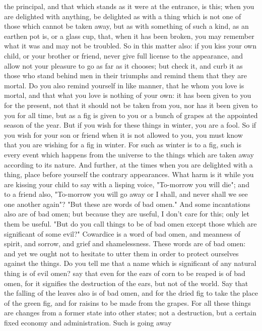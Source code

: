 \documentclass[a4paper]{article}
\begin{document}
the principal, and that which stands as it were at the entrance, is this; when
you are delighted with anything, be delighted as with a thing which is not one
of those which cannot be taken away, but as with something of such a kind, as
an earthen pot is, or a glass cup, that, when it has been broken, you may
remember what it was and may not be troubled. So in this matter also: if you
kiss your own child, or your brother or friend, never give full license to the
appearance, and allow not your pleasure to go as far as it chooses; but check
it, and curb it as those who stand behind men in their triumphs and remind them
that they are mortal. Do you also remind yourself in like manner, that he whom
you love is mortal, and that what you love is nothing of your own: it has been
given to you for the present, not that it should not be taken from you, nor has
it been given to you for all time, but as a fig is given to you or a bunch of
grapes at the appointed season of the year. But if you wish for these things in
winter, you are a fool. So if you wish for your son or friend when it is not
allowed to you, you must know that you are wishing for a fig in winter. For
such as winter is to a fig, such is every event which happens from the universe
to the things which are taken away according to its nature. And further, at the
times when you are delighted with a thing, place before yourself the contrary
appearances. What harm is it while you are kissing your child to say with a
lisping voice, "To-morrow you will die"; and to a friend also, "To-morrow you
will go away or I shall, and never shall we see one another again"? "But these
are words of bad omen." And some incantations also are of bad omen; but because
they are useful, I don't care for this; only let them be useful. "But do you
call things to be of bad omen except those which are significant of some evil?"
Cowardice is a word of bad omen, and meanness of spirit, and sorrow, and grief
and shamelessness. These words are of bad omen: and yet we ought not to
hesitate to utter them in order to protect ourselves against the things. Do you
tell me that a name which is significant of any natural thing is of evil omen?
say that even for the ears of corn to be reaped is of bad omen, for it
signifies the destruction of the ears, but not of the world. Say that the
falling of the leaves also is of bad omen, and for the dried fig to take the
place of the green fig, and for raisins to be made from the grapes. For all
these things are changes from a former state into other states; not a
destruction, but a certain fixed economy and administration. Such is going away
\end{document}
